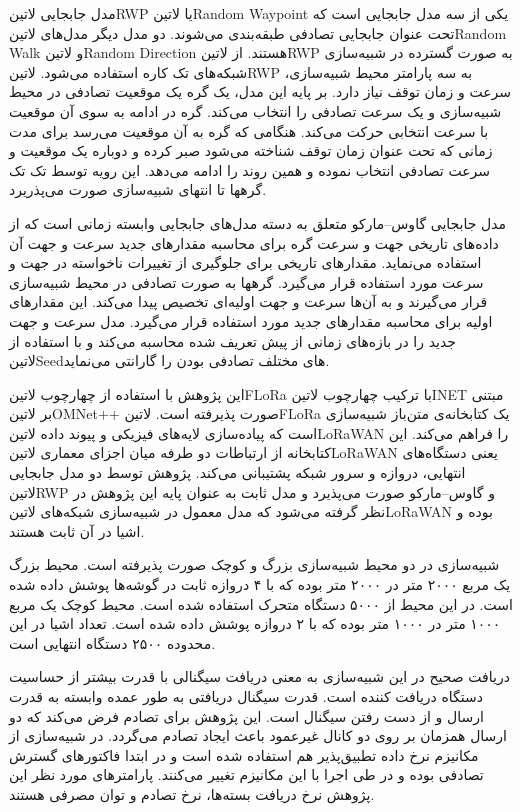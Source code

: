 مدل جابجایی ‌لاتین{RWP} یا ‌لاتین{Random Waypoint} یکی از سه مدل جابجایی است که تحت عنوان جابجایی تصادفی طبقه‌بندی می‌شوند.
دو مدل دیگر مدل‌های ‌لاتین{Random Walk} و ‌لاتین{Random Direction} هستند.
از ‌لاتین{RWP} به صورت گسترده در شبیه‌سازی شبکه‌های تک کاره استفاده می‌شود.
‌لاتین{RWP} به سه پارامتر محیط شبیه‌سازی، سرعت و زمان توقف نیاز دارد.
بر پایه این مدل، یک گره یک موقعیت تصادفی در محیط شبیه‌سازی و یک سرعت تصادفی را انتخاب می‌کند.
گره در ادامه به سوی آن موقعیت با سرعت انتخابی حرکت می‌کند. هنگامی که گره به آن موقعیت می‌رسد برای مدت زمانی که تحت عنوان زمان توقف
شناخته می‌شود صبر کرده و دوباره یک موقعیت و سرعت تصادفی انتخاب نموده و همین روند را ادامه می‌دهد. این رویه توسط تک تک گرهها تا انتهای
شبیه‌سازی صورت می‌پذریرد.

مدل جابجایی گاوس--مارکو متعلق به دسته مدل‌های جابجایی وابسته زمانی است که از داده‌های تاریخی جهت و سرعت گره برای محاسبه
مقدارهای جدید سرعت و جهت آن استفاده می‌نماید. مقدارهای تاریخی برای جلوگیری از تغییرات ناخواسته در جهت و سرعت مورد استفاده قرار می‌گیرد.
گرهها به صورت تصادفی در محیط شبیه‌سازی قرار می‌گیرند و به آن‌ها سرعت و جهت اولیه‌ای تخصیص پیدا می‌کند.
این مقدارهای اولیه برای محاسبه مقدارهای جدید مورد استفاده قرار می‌گیرد.
مدل سرعت و جهت جدید را در بازه‌های زمانی از پیش تعریف شده محاسبه می‌کند و با استفاده از ‌لاتین{Seed}های مختلف تصادفی بودن را گارانتی می‌نماید.

این پژوهش با استفاده از چهارچوب ‌لاتین{FLoRa} با ترکیب چهارچوب ‌لاتین{INET} مبتنی بر ‌لاتین{OMNet++} صورت پذیرفته است.
‌لاتین{FLoRa} یک کتابخانه‌ی متن‌باز شبیه‌سازی است که پیاده‌سازی لایه‌های فیزیکی و پیوند داده ‌لاتین{LoRaWAN} را فراهم می‌کند.
این کتابخانه از ارتباطات دو طرفه میان اجزای معماری ‌لاتین{LoRaWAN} یعنی دستگاه‌های انتهایی، دروازه و سرور شبکه پشتیبانی می‌کند.
پژوهش توسط دو مدل جابجایی ‌لاتین{RWP} و گاوس--مارکو صورت می‌پذیرد و مدل ثابت به عنوان پایه این پژوهش در نظر گرفته می‌شود که مدل معمول
در شبیه‌سازی شبکه‌های ‌لاتین{LoRaWAN} بوده و اشیا در آن ثابت هستند.

شبیه‌سازی در دو محیط شبیه‌سازی بزرگ و کوچک صورت پذیرفته است. محیط بزرگ یک مربع ۲۰۰۰ متر در ۲۰۰۰ متر بوده که با ۴ دروازه
ثابت در گوشه‌ها پوشش داده شده است. در این محیط از ۵۰۰۰ دستگاه متحرک استفاده شده است.
محیط کوچک یک مربع ۱۰۰۰ متر در ۱۰۰۰ متر بوده که با ۲ دروازه پوشش داده شده است.
تعداد اشیا در این محدوده ۲۵۰۰ دستگاه انتهایی است.

دریافت صحیح در این شبیه‌سازی به معنی دریافت سیگنالی با قدرت بیشتر از حساسیت دستگاه دریافت کننده است.
قدرت سیگنال دریافتی به طور عمده وابسته به قدرت ارسال و از دست رفتن سیگنال است.
این پژوهش برای تصادم فرض می‌کند که دو ارسال همزمان بر روی دو کانال غیرعمود باعث ایجاد تصادم می‌گردد.
در شبیه‌سازی از مکانیزم نرخ داده تطبیق‌پذیر هم استفاده شده است و در ابتدا فاکتورهای گسترش تصادفی بوده و در طی اجرا با این مکانیزم
تغییر می‌کنند. پارامترهای مورد نظر این پژوهش نرخ دریافت بسته‌ها، نرخ تصادم و توان مصرفی هستند.

